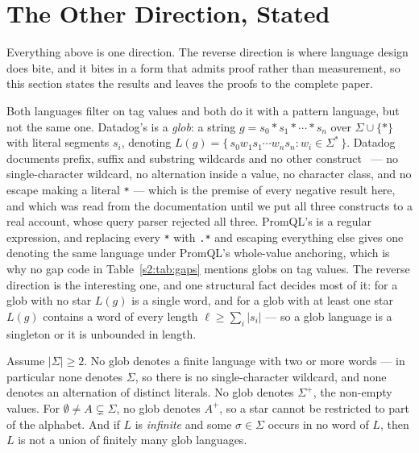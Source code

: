 
\section{The Other Direction, Stated}
\label{s2:sec:reverse}

Everything above is one direction. The reverse direction is where language design does
bite, and it bites in a form that admits proof rather than measurement, so this section
states the results and leaves the proofs to the complete paper.

Both languages filter on tag values and both do it with a pattern language, but not the
same one. Datadog's is a \emph{glob}: a string $g=s_0*s_1*\cdots*s_n$ over
$\Sigma\cup\{*\}$ with literal segments $s_i$, denoting
$L(g)=\{\,s_0w_1s_1\cdots w_ns_n : w_i\in\Sigma^{*}\,\}$. Datadog documents prefix, suffix
and substring wildcards and no other construct~\citep{ddfilter} --- no single-character
wildcard, no alternation inside a value, no character class, and no escape making a literal
\texttt{*} --- which is the premise of every negative result here, and which was read from
the documentation until we put all three constructs to a real account, whose query parser
rejected all three. PromQL's is a regular expression, and replacing every \texttt{*} with
\texttt{.*} and escaping everything else gives one denoting the same language under
PromQL's whole-value anchoring, which is why no gap code in Table~\ref{s2:tab:gaps}
mentions globs on tag values. The reverse direction is the interesting one, and one
structural fact decides most of it: for a glob with no star $L(g)$ is a single word, and
for a glob with at least one star $L(g)$ contains a word of every length
$\ell\ge\sum_i|s_i|$ --- so a glob language is a singleton or it is unbounded in length.

\begin{corollary}\label{s2:cor:no-glob}
Assume $|\Sigma|\ge 2$. No glob denotes a finite language with two or more words --- in
particular none denotes $\Sigma$, so there is no single-character wildcard, and none
denotes an alternation of distinct literals. No glob denotes $\Sigma^{+}$, the non-empty
values. For $\emptyset\neq A\subsetneq\Sigma$, no glob denotes $A^{+}$, so a star cannot be
restricted to part of the alphabet. And if $L$ is \emph{infinite} and some $\sigma\in\Sigma$
occurs in no word of $L$, then $L$ is not a union of finitely many glob languages.
\end{corollary}

